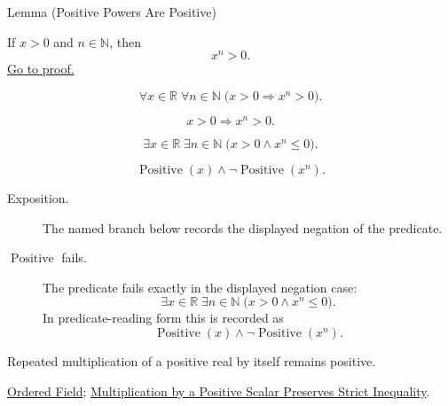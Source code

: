 \begin{lemmabox}{Lemma (Positive Powers Are Positive)}
\begin{lemma}
\label{lem:positive-powers-are-positive}
If $x>0$ and $n\in\mathbb{N}$, then
\[
x^n>0.
\]
\hyperref[prf:positive-powers-are-positive]{Go to proof.}
\end{lemma}
\end{lemmabox}
\begin{remark*}
\[
\forall x\in\mathbb{R}\;\forall n\in\mathbb{N}\;
\bigl(x>0\Rightarrow x^n>0\bigr).
\]
\end{remark*}
\begin{remark*}
\[
x>0\Rightarrow x^n>0.
\]
\end{remark*}
\begin{remark*}
\[
\exists x\in\mathbb{R}\;\exists n\in\mathbb{N}\;
\bigl(x>0\land x^n\le 0\bigr).
\]
\end{remark*}
\begin{remark*}
\[
\operatorname{Positive}(x)\land\neg\operatorname{Positive}(x^n).
\]
\end{remark*}

\begin{remark*}
\begin{description}
  \item[Exposition.] The named branch below records the displayed negation of the predicate.
  \item[\(\operatorname{Positive}\) fails.] The predicate fails exactly in the displayed negation case:
  \[
  \exists x\in\mathbb{R}\;\exists n\in\mathbb{N}\;
  \bigl(x>0\land x^n\le 0\bigr).
  \]
  In predicate-reading form this is recorded as
  \[
  \operatorname{Positive}(x)\land\neg\operatorname{Positive}(x^n).
  \]
\end{description}
\end{remark*}
\begin{remark*}[Interpretation]
Repeated multiplication of a positive real by itself remains positive.
\end{remark*}
\begin{dependencies}
\hyperref[def:real-ordered-field]{Ordered Field};
\hyperref[thm:ineq-multiply-positive]{Multiplication by a Positive Scalar Preserves Strict Inequality}.
\end{dependencies}

